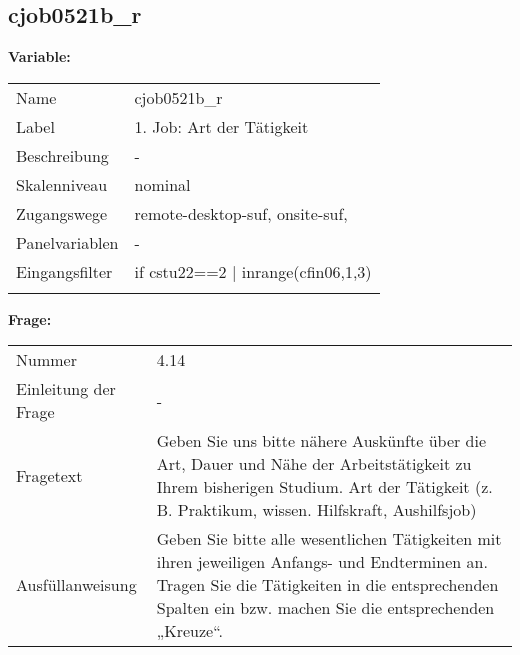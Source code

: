 	
	
	\subsection{cjob0521b\_r}
	\label{subSection:cjob0521b_r}

	\noindent\textbf{Variable:}\\
		\begin{tabular}{lL{11.3cm}}
			\label{tableVariable:cjob0521b_r}
			Name & cjob0521b\_r \\
			Label & 1. Job: Art der Tätigkeit \\
			Beschreibung & - \\
			Skalenniveau & nominal \\
			Zugangswege &
				remote-desktop-suf,
				onsite-suf,
 \\
			Panelvariablen & -
			 \\
			Eingangsfilter & if cstu22==2 | inrange(cfin06,1,3) \\
 \\
		\end{tabular}

		\vspace*{1 cm}
		\noindent\textbf{Frage:}\\
		\begin{tabular}{lL{11.3cm}}
			\label{tableQuestion:cjob0521b_r}
			Nummer & 4.14 \\
			Einleitung der Frage & - \\
			Fragetext & Geben Sie uns bitte nähere Auskünfte über die Art, Dauer und Nähe der Arbeitstätigkeit zu Ihrem bisherigen Studium.
Art der Tätigkeit
(z. B. Praktikum, wissen. Hilfskraft, Aushilfsjob) \\
			Ausfüllanweisung & Geben Sie bitte alle wesentlichen Tätigkeiten mit ihren jeweiligen Anfangs- und Endterminen an. Tragen Sie die Tätigkeiten in die entsprechenden Spalten ein bzw. machen Sie die entsprechenden „Kreuze“. \\
		\end{tabular}





